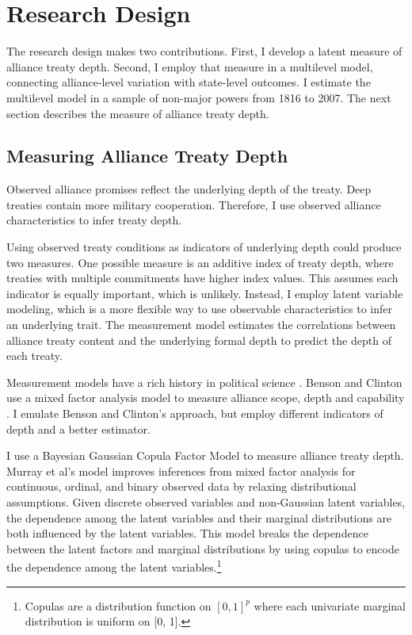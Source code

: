 \documentclass[12pt]{article}
\begin{document}
\section{Research Design} 


The research design makes two contributions. 
First, I develop a latent measure of alliance treaty depth. 
Second, I employ that measure in a multilevel model, connecting alliance-level variation with state-level outcomes. 
I estimate the multilevel model in a sample of non-major powers from 1816 to 2007. 
The next section describes the measure of alliance treaty depth. 


\subsection{Measuring Alliance Treaty Depth} 


Observed alliance promises reflect the underlying depth of the treaty. 
Deep treaties contain more military cooperation. 
Therefore, I use observed alliance characteristics to infer treaty depth.


Using observed treaty conditions as indicators of underlying depth could produce two measures. 
One possible measure is an additive index of treaty depth, where treaties with multiple commitments have higher index values. 
This assumes each indicator is equally important, which is unlikely. 
Instead, I employ latent variable modeling, which is a more flexible way to use observable characteristics to infer an underlying trait.  
The measurement model estimates the correlations between alliance treaty content and the underlying formal depth to predict the depth of each treaty. 


Measurement models have a rich history in political science \citep{Clintonetal2004, TreierJackman2008, Fariss2014}.
Benson and Clinton use a mixed factor analysis model to measure alliance scope, depth and capability \citep{BensonClinton2016, Quinn2004}.  
I emulate Benson and Clinton's approach, but employ different indicators of depth and a better estimator. 


I use a Bayesian Gaussian Copula Factor Model \citep{Murrayetal2013} to measure alliance treaty depth. 
Murray et al's model improves inferences from mixed factor analysis for continuous, ordinal, and binary observed data by relaxing distributional assumptions. 
Given discrete observed variables and non-Gaussian latent variables, the dependence among the latent variables and their marginal distributions are both influenced by the latent variables.
This model breaks the dependence between the latent factors and marginal distributions by using copulas to encode the dependence among the latent variables.\footnote{Copulas are a distribution function on $[0, 1]^p$ where each univariate marginal distribution is uniform on [0, 1].}
\end{document}
